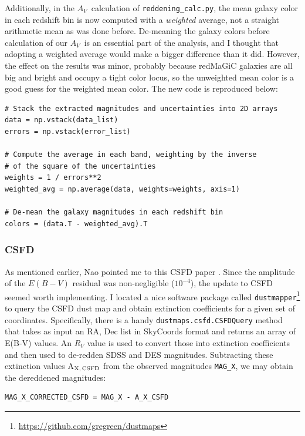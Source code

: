\documentclass[11pt, oneside]{article}   	%
\newcommand{\av}{$A_V$~}
\begin{document}
Additionally, in the \av calculation of \texttt{reddening\_calc.py}, the mean galaxy color in each redshift bin is now computed with a \textit{weighted} average, not a straight arithmetic mean as was done before. De-meaning the galaxy colors before calculation of our \av is an essential part of the analysis, and I thought that adopting a weighted average would make a bigger difference than it did. However, the effect on the results was minor, probably because redMaGiC galaxies are all big and bright and occupy a tight color locus, so the unweighted mean color is a good guess for the weighted mean color. The new code is reproduced below: 

\small
\begin{verbatim}
# Stack the extracted magnitudes and uncertainties into 2D arrays
data = np.vstack(data_list)
errors = np.vstack(error_list)

# Compute the average in each band, weighting by the inverse
# of the square of the uncertainties
weights = 1 / errors**2
weighted_avg = np.average(data, weights=weights, axis=1)

# De-mean the galaxy magnitudes in each redshift bin
colors = (data.T - weighted_avg).T

\end{verbatim}
\normalsize

\subsubsection{CSFD}

As mentioned earlier, Nao pointed me to this CSFD paper \cite{2023ApJ...958..118C}. Since the amplitude of the $E(B-V)$ residual was non-negligible ($10^{-4}$), the update to CSFD seemed worth implementing. I located a nice software package called \texttt{dustmapper}\footnote{\url{https://github.com/gregreen/dustmaps}} to query the CSFD dust map and obtain extinction coefficients for a given set of coordinates. Specifically, there is a handy \texttt{dustmaps.csfd.CSFDQuery} method that takes as input an RA, Dec list in SkyCoords format and returns an array of E(B-V) values. An $R_V$ value is used to convert those into extinction coefficients and then used to de-redden SDSS and DES magnitudes. 
Subtracting these extinction values A$_{\rm X,\, CSFD}$ from the observed magnitudes \texttt{MAG\_X}, we may obtain the dereddened magnitudes:
\small
\begin{verbatim}
MAG_X_CORRECTED_CSFD = MAG_X - A_X_CSFD
\end{verbatim}
\normalsize
\end{document}
